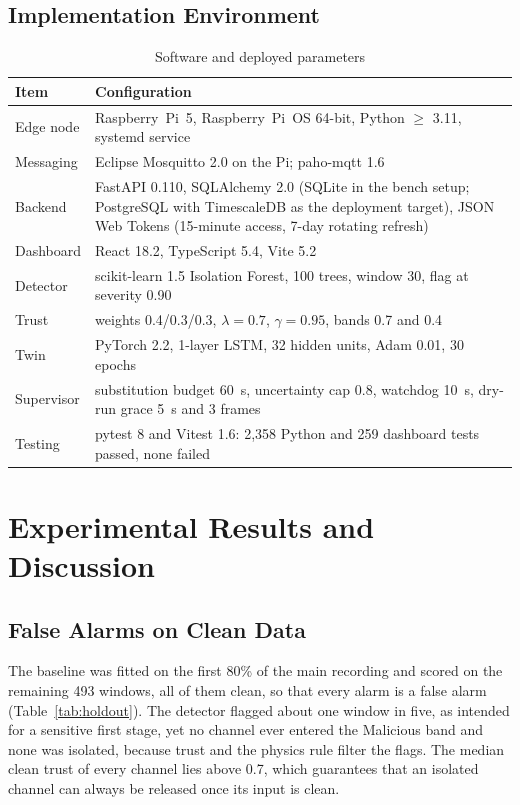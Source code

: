 \documentclass[11pt,a4paper]{article}
\begin{document}
\subsection{Implementation Environment}

\begin{table}[H]
\centering
\caption{Software and deployed parameters}
\label{tab:params}
\small
\begin{tabularx}{\textwidth}{@{}P{3.5cm} X@{}}
\toprule
\textbf{Item} & \textbf{Configuration} \\
\midrule
Edge node & Raspberry~Pi~5, Raspberry~Pi~OS 64-bit, Python $\geq$ 3.11, systemd service \\
Messaging & Eclipse Mosquitto 2.0 on the Pi; paho-mqtt 1.6 \\
Backend & FastAPI 0.110, SQLAlchemy 2.0 (SQLite in the bench setup; PostgreSQL with TimescaleDB as the deployment target), JSON Web Tokens (15-minute access, 7-day rotating refresh) \\
Dashboard & React 18.2, TypeScript 5.4, Vite 5.2 \\
Detector & scikit-learn 1.5 Isolation Forest, 100 trees, window 30, flag at severity 0.90 \\
Trust & weights 0.4/0.3/0.3, $\lambda = 0.7$, $\gamma = 0.95$, bands 0.7 and 0.4 \\
Twin & PyTorch 2.2, 1-layer LSTM, 32 hidden units, Adam 0.01, 30 epochs \\
Supervisor & substitution budget 60~s, uncertainty cap 0.8, watchdog 10~s, dry-run grace 5~s and 3 frames \\
Testing & pytest 8 and Vitest 1.6: 2,358 Python and 259 dashboard tests passed, none failed \\
\bottomrule
\end{tabularx}
\end{table}

\section{Experimental Results and Discussion}
\label{sec:results}

\subsection{False Alarms on Clean Data}

The baseline was fitted on the first 80\% of the main recording and scored on the remaining 493 windows, all of them clean, so that every alarm is a false alarm (Table~\ref{tab:holdout}). The detector flagged about one window in five, as intended for a sensitive first stage, yet no channel ever entered the Malicious band and none was isolated, because trust and the physics rule filter the flags. The median clean trust of every channel lies above 0.7, which guarantees that an isolated channel can always be released once its input is clean.
\end{document}
